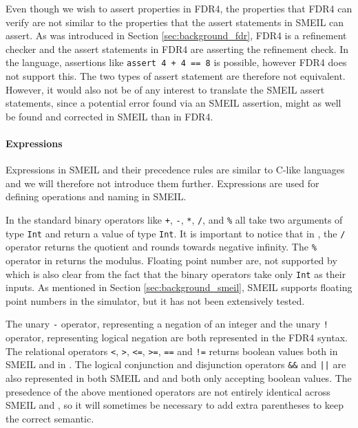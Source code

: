 Even though we wish to assert properties in FDR4, the properties that FDR4 can verify are not similar to the properties that the assert statements in SMEIL can assert. As was introduced in Section \ref{sec:background_fdr}, FDR4 is a refinement checker and the assert statements in FDR4 are asserting the refinement check. In the \cspm language, assertions like \texttt{assert 4 + 4 == 8} is possible, however FDR4 does not support this. The two types of assert statement are therefore not equivalent. However, it would also not be of any interest to translate the SMEIL assert statements, since a potential error found via an SMEIL assertion, might as well be found and corrected in SMEIL than in FDR4.

\paragraph{Expressions}
Expressions in SMEIL and their precedence rules are similar to C-like languages and we will therefore not introduce them further. Expressions are used for defining operations and naming in SMEIL.

In \cspm the standard binary operators like \texttt{+}, \texttt{-}, \texttt{*}, \texttt{/}, and \texttt{\%} all take two arguments of type \texttt{Int} and return a value of type \texttt{Int}. It is important to notice that in \cspm, the \texttt{/} operator returns the quotient and rounds towards negative infinity. The \texttt{\%} operator in \cspm returns the modulus.
Floating point number are, not supported by \cspm{}\cite{Scattergood2011} which is also clear from the fact that the binary operators take only \texttt{Int} as their inputs.
As mentioned in Section \ref{sec:background_smeil}, SMEIL supports floating point numbers in the simulator, but it has not been extensively tested.

The unary \texttt{-} operator, representing a negation of an integer and the unary \texttt{!} operator, representing logical negation are both represented in the FDR4 syntax. The relational operators \texttt{<}, \texttt{>}, \texttt{<=}, \texttt{>=}, \texttt{==} and \texttt{!=} returns boolean values both in SMEIL and in \cspm. The logical conjunction and disjunction operators \texttt{\&\&} and \texttt{||} are also represented in both SMEIL and \cspm and both only accepting boolean values.
The presedence of the above mentioned operators are not entirely identical across SMEIL and \cspm, so it will sometimes be necessary to add extra parentheses to keep the correct semantic.

